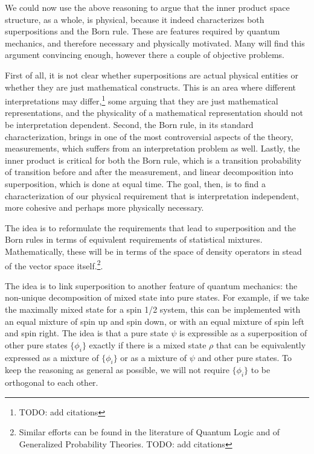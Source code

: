 \documentclass[10pt,twocolumn, nofootinbib]{revtex4-2}
\begin{document}
We could now use the above reasoning to argue that the inner product space structure, as a whole, is physical, because it indeed characterizes both superpositions and the Born rule. These are features required by quantum mechanics, and therefore necessary and physically motivated. Many will find this argument convincing enough, however there a couple of objective problems.

First of all, it is not clear whether superpositions are actual physical entities or whether they are just mathematical constructs. This is an area where different interpretations may differ,\footnote{TODO: add citations} some arguing that they are just mathematical representations, and the physicality of a mathematical representation should not be interpretation dependent. Second, the Born rule, in its standard characterization, brings in one of the most controversial aspects of the theory, measurements, which suffers from an interpretation problem as well. Lastly, the inner product is critical for both the Born rule, which is a transition probability of transition before and after the measurement, and linear decomposition into superposition, which is done at equal time. The goal, then, is to find a characterization of our physical requirement that is interpretation independent, more cohesive and perhaps more physically necessary.

The idea is to reformulate the requirements that lead to superposition and the Born rules in terms of equivalent requirements of statistical mixtures. Mathematically, these will be in terms of the space of density operators in stead of the vector space itself.\footnote{Similar efforts can be found in the literature of Quantum Logic and of Generalized Probability Theories. TODO: add citations}.

The idea is to link superposition to another feature of quantum mechanics: the non-unique decomposition of mixed state into pure states. For example, if we take the maximally mixed state for a spin 1/2 system, this can be implemented with an equal mixture of spin up and spin down, or with an equal mixture of spin left and spin right. The idea is that a pure state $\psi$ is expressible as a superposition of other pure states $\{\phi_i\}$ exactly if there is a mixed state $\rho$ that can be equivalently expressed as a mixture of $\{\phi_i\}$ or as a mixture of $\psi$ and other pure states. To keep the reasoning as general as possible, we will not require $\{\phi_i\}$ to be orthogonal to each other.
\end{document}
